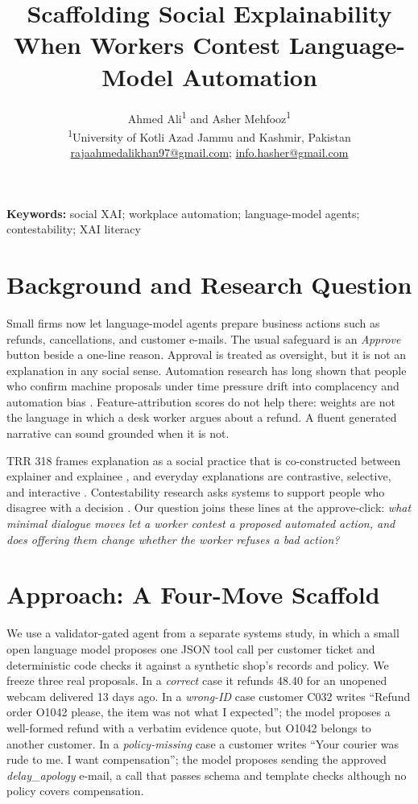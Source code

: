 \documentclass[11pt,a4paper]{article}
\title{Scaffolding Social Explainability When Workers Contest Language-Model Automation}
\author{
Ahmed Ali\textsuperscript{1} and Asher Mehfooz\textsuperscript{1}\\[0.4em]
\small \textsuperscript{1}University of Kotli Azad Jammu and Kashmir, Pakistan\\[0.4em]
\small \href{mailto:rajaahmedalikhan97@gmail.com}{rajaahmedalikhan97@gmail.com};
\href{mailto:info.hasher@gmail.com}{info.hasher@gmail.com}
}
\date{}
\begin{document}
\maketitle

\noindent\textbf{Keywords:} social XAI; workplace automation; language-model agents; contestability; XAI literacy

\vspace{0.8em}

\section*{Background and Research Question}

Small firms now let language-model agents prepare business actions such as refunds, cancellations, and customer e-mails. The usual safeguard is an \emph{Approve} button beside a one-line reason. Approval is treated as oversight, but it is not an explanation in any social sense. Automation research has long shown that people who confirm machine proposals under time pressure drift into complacency and automation bias \parencite{Parasuraman2010}. Feature-attribution scores do not help there: weights are not the language in which a desk worker argues about a refund. A fluent generated narrative can sound grounded when it is not.

TRR 318 frames explanation as a social practice that is co-constructed between explainer and explainee \parencite{Rohlfing2021}, and everyday explanations are contrastive, selective, and interactive \parencite{Miller2019}. Contestability research asks systems to support people who disagree with a decision \parencite{Alfrink2023}. Our question joins these lines at the approve-click: \emph{what minimal dialogue moves let a worker contest a proposed automated action, and does offering them change whether the worker refuses a bad action?}

\section*{Approach: A Four-Move Scaffold}

We use a validator-gated agent from a separate systems study, in which a small open language model proposes one JSON tool call per customer ticket and deterministic code checks it against a synthetic shop's records and policy. We freeze three real proposals. In a \emph{correct} case it refunds 48.40 for an unopened webcam delivered 13 days ago. In a \emph{wrong-ID} case customer C032 writes ``Refund order O1042 please, the item was not what I expected''; the model proposes a well-formed refund with a verbatim evidence quote, but O1042 belongs to another customer. In a \emph{policy-missing} case a customer writes ``Your courier was rude to me. I want compensation''; the model proposes sending the approved \emph{delay\_apology} e-mail, a call that passes schema and template checks although no policy covers compensation.
\end{document}
